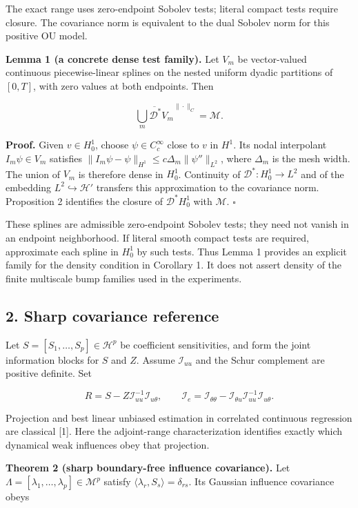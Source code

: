 \documentclass[
  american,
  11pt,
]{article}
\begin{document}
The exact range uses zero-endpoint Sobolev tests; literal compact tests
require closure. The covariance norm is equivalent to the dual Sobolev
norm for this positive OU model.

\textbf{Lemma 1 (a concrete dense test family).} Let \(V_m\) be
vector-valued continuous piecewise-linear splines on the nested uniform
dyadic partitions of \([0,T]\), with zero values at both endpoints. Then

\[
\overline{\bigcup_m\mathcal D^*V_m}^{\|\cdot\|_C}=\mathcal M.
\]

\textbf{Proof.} Given \(v\in H_0^1\), choose \(\psi\in C_c^\infty\)
close to \(v\) in \(H^1\). Its nodal interpolant \(I_m\psi\in V_m\)
satisfies \(\|I_m\psi-\psi\|_{H^1}\leq c\Delta_m\|\psi''\|_{L^2}\),
where \(\Delta_m\) is the mesh width. The union of \(V_m\) is therefore
dense in \(H_0^1\). Continuity of \(\mathcal D^*:H_0^1\to L^2\) and of
the embedding \(L^2\hookrightarrow\mathcal H'\) transfers this
approximation to the covariance norm. Proposition 2 identifies the
closure of \(\mathcal D^*H_0^1\) with \(\mathcal M\). \(\square\)

These splines are admissible zero-endpoint Sobolev tests; they need not
vanish in an endpoint neighborhood. If literal smooth compact tests are
required, approximate each spline in \(H_0^1\) by such tests. Thus Lemma
1 provides an explicit family for the density condition in Corollary 1.
It does not assert density of the finite multiscale bump families used
in the experiments.

\subsection{2. Sharp covariance
reference}\label{sharp-covariance-reference}

Let \(S=[S_1,\ldots,S_p]\in\mathcal H^p\) be coefficient sensitivities,
and form the joint information blocks for \(S\) and \(Z\). Assume
\(\mathcal I_{uu}\) and the Schur complement are positive definite. Set

\[
R=S-Z\mathcal I_{uu}^{-1}\mathcal I_{u\theta},
\qquad
\mathcal I_e=\mathcal I_{\theta\theta}
-\mathcal I_{\theta u}\mathcal I_{uu}^{-1}\mathcal I_{u\theta}.
\]

Projection and best linear unbiased estimation in correlated continuous
regression are classical {[}1{]}. Here the adjoint-range
characterization identifies exactly which dynamical weak influences obey
that projection.

\textbf{Theorem 2 (sharp boundary-free influence covariance).} Let
\(\Lambda=[\lambda_1,\ldots,\lambda_p]\in\mathcal M^p\) satisfy
\(\langle\lambda_r,S_s\rangle=\delta_{rs}\). Its Gaussian influence
covariance obeys
\end{document}
